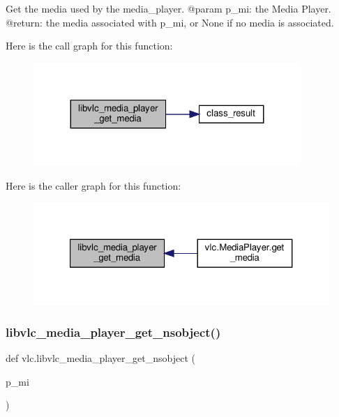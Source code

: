 \begin{DoxyVerb}Get the media used by the media_player.
@param p_mi: the Media Player.
@return: the media associated with p_mi, or None if no media is associated.
\end{DoxyVerb}
 Here is the call graph for this function\+:
\nopagebreak
\begin{figure}[H]
\begin{center}
\leavevmode
\includegraphics[width=287pt]{namespacevlc_afeedcdc930247eca6504d41de3af7275_cgraph}
\end{center}
\end{figure}
Here is the caller graph for this function\+:
\nopagebreak
\begin{figure}[H]
\begin{center}
\leavevmode
\includegraphics[width=321pt]{namespacevlc_afeedcdc930247eca6504d41de3af7275_icgraph}
\end{center}
\end{figure}
\mbox{\label{namespacevlc_ac916d9f7b58a94ee7e081b110bb983fc}} 
\subsubsection{\texorpdfstring{libvlc\+\_\+media\+\_\+player\+\_\+get\+\_\+nsobject()}{libvlc\_media\_player\_get\_nsobject()}}
{\footnotesize\ttfamily def vlc.\+libvlc\+\_\+media\+\_\+player\+\_\+get\+\_\+nsobject (\begin{DoxyParamCaption}\item[{}]{p\+\_\+mi }\end{DoxyParamCaption})}

